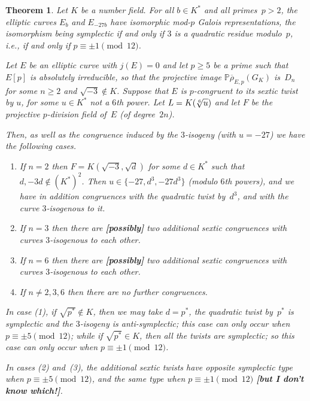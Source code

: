 \documentclass[12pt, reqno]{amsart}
\newcommand{\PP}{\mathbb{P}}
\newcommand{\rhobar}{{\overline{\rho}}}
\numberwithin{equation}{section}
\newtheorem{theorem}{Theorem}[section]
\theoremstyle{definition}
\theoremstyle{remark}
\begin{document}
\begin{theorem}\label{T:j=0}
Let $K$ be a number field.  For all $b \in K^*$ and all primes~$p>2$,
the elliptic curves $E_b$ and $E_{-27b}$ have isomorphic mod-$p$
Galois representations, the isomorphism being symplectic if and only
if $3$ is a quadratic residue modulo~$p$, \textit{i.e.}, if and only
if $p\equiv\pm1\pmod{12}$.

Let $E$ be an elliptic curve with $j(E)=0$ and let $p\ge5$ be a prime
such that $E[p]$ is absolutely irreducible, so that the projective
image $\PP\rhobar_{E,p}(G_K)$ is~$D_n$ for some $n\ge2$ and
$\sqrt{-3}\not\in K$.  Suppose that $E$ is $p$-congruent to its sextic
twist by $u$, for some $u\in K^*$ not a $6$th power.  Let
$L=K(\root6\of{u})$ and let $F$ be the projective $p$-division field
of~$E$ (of degree~$2n$).

Then, as well as the congruence induced by the $3$-isogeny (with
$u=-27$) we have the following cases.
\begin{enumerate}
  \item If $n=2$ then $F=K(\sqrt{-3},\sqrt{d})$ for some $d\in K^*$
    such that $d,-3d\not\in(K^*)^2$.  Then $u\in\{-27,d^3,-27d^3\}$
    (modulo $6$th powers), and we have in addition congruences with
    the quadratic twist by~$d^3$, and with the curve $3$-isogenous to
    it.
  \item If $n=3$ then there are \textbf{[possibly]} two additional
    sextic congruences with curves $3$-isogenous to each other.
  \item If $n=6$ then there are \textbf{[possibly]} two additional
    sextic congruences with curves $3$-isogenous to each other.
  \item If $n\not=2,3,6$ then there are no further congruences.
\end{enumerate}
In case (1), if $\sqrt{p^*}\not\in K$, then we may take $d=p^*$, the
quadratic twist by~$p^*$ is symplectic and the $3$-isogeny is
anti-symplectic; this case can only occur when $p\equiv\pm5\pmod{12}$;
while if $\sqrt{p^*}\in K$, then all the twists are symplectic; so
this case can only occur when $p\equiv\pm1\pmod{12}$.

In cases (2) and~(3), the additional sextic twists have opposite
symplectic type when $p\equiv\pm5\pmod{12}$, and the same type when
$p\equiv\pm1\pmod{12}$ \textbf{[but I don't know which!]}.
\end{theorem}
\end{document}

